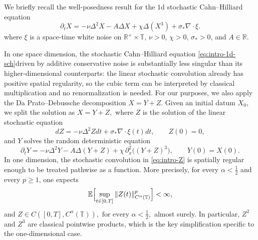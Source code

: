 \documentclass{article}
\begin{document}
We briefly recall the well-posedness result for the $1$d stochastic Cahn--Hilliard equation
\begin{equation}\label{eq:intro-1d-sch}
\partial_t X = -\nu \Delta^2 X - A \Delta X + \chi \Delta(X^3) + \sigma_* \nabla \cdot\xi.
\end{equation}
where \(\xi\) is a space-time white noise on $\mathbb R^{+} \times \mathbb T$, \(\nu>0\), \(\chi>0\), \(\sigma_*>0\), and \(A\in\mathbb R\).

In one space dimension, the stochastic Cahn--Hilliard equation \eqref{eq:intro-1d-sch}driven by additive conservative noise is substantially less singular than its higher-dimensional counterparts: the linear stochastic convolution already has positive spatial regularity, so the cubic term can be interpreted by classical multiplication and no renormalization is needed. 
For our purposes, we also apply the Da Prato--Debussche decomposition $X=Y+Z$.
Given an initial datum \(X_0\), we split the solution as
\(
X=Y+Z,
\)
where \(Z\) is the solution of the linear stochastic equation
\begin{equation}
\label{eq:intro-Z}
dZ= -\nu \Delta^2 Z dt+\sigma_*\nabla\cdot\xi(t)dt,
\qquad
Z(0)=0,
\end{equation}
and \(Y\) solves the random deterministic equation
\begin{equation}
\label{eq:intro-Y}
\partial_t Y
=-\nu \Delta^2  Y - A\Delta (Y+Z)
+\chi\,\partial_x^2\bigl((Y+Z)^3\bigr),
\qquad
Y(0)=X(0).
\end{equation}
In one dimension, the stochastic convolution in \eqref{eq:intro-Z} is spatially regular enough
to be treated pathwise as a function.
More precisely, for every \(\alpha<\frac12\) and every \(p\ge 1\), one expects
\begin{equation}
\label{eq:intro-Z-est}
\mathbb E\Bigl[\sup_{t\in[0,T]}\|Z(t)\|_{C^\alpha(\mathbb T)}^p\Bigr]<\infty,
\end{equation}
and 
\(
Z\in C([0,T], C^\alpha(\mathbb T)), \text{ for every } \alpha<\frac12,
\)
almost surely.
In particular, \(Z^2\) and \(Z^3\) are classical pointwise products, which is the key simplification specific to the one-dimensional case.
\end{document}
